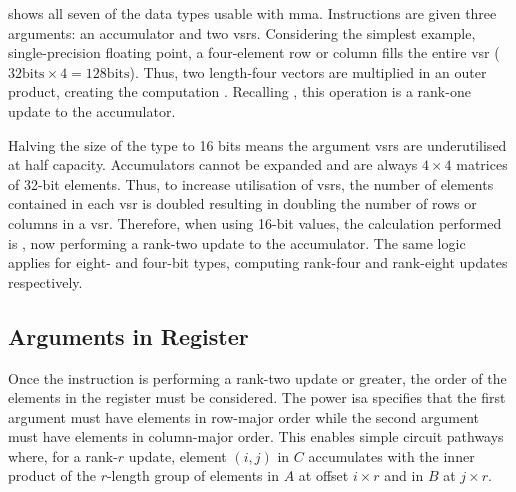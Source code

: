 \documentclass[\main/thesis.tex]{subfiles}
\begin{document}
 shows all seven of the data types usable with \gls{mma}.
Instructions are given three arguments: an accumulator and two \glspl{vsr}.
Considering the simplest example, single-precision floating point, a four-element row or column fills the entire \gls{vsr} ($32\text{bits} \times 4 = 128\text{bits}$).
Thus, two length-four vectors are multiplied in an outer product, creating the computation .
Recalling , this operation is a rank-one update to the accumulator.

Halving the size of the type to 16 bits means the argument \glspl{vsr} are underutilised at half capacity.
Accumulators cannot be expanded and are always $4 \times 4$ matrices of 32-bit elements.
Thus, to increase utilisation of \glspl{vsr}, the number of elements contained in each \gls{vsr} is doubled resulting in doubling the number of rows or columns in a \gls{vsr}.
Therefore, when using 16-bit values, the calculation performed is , now performing a rank-two update to the accumulator.
The same logic applies for eight- and four-bit types, computing rank-four and rank-eight updates respectively.

\subsection{Arguments in Register}
\label{sec:registerArguments}
Once the instruction is performing a rank-two update or greater, the order of the elements in the register must be considered.
The \gls{power} \gls{isa} specifies that the first argument must have elements in row-major order while the second argument must have elements in column-major order.
This enables simple circuit pathways where, for a rank-$r$ update, element $(i, j)$ in $C$ accumulates with the inner product of the $r$-length group of elements in $A$ at offset $i \times r$ and in $B$ at $j \times r$.\footnotemark
{}
\end{document}
